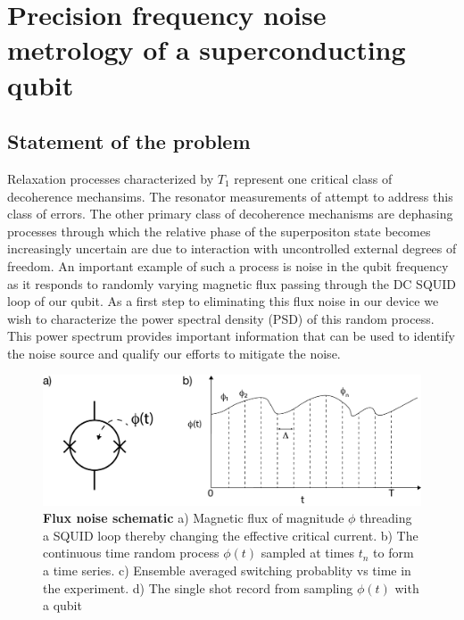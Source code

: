 \chapter{Precision frequency noise metrology of a superconducting qubit}

\section{Statement of the problem}
Relaxation processes characterized by $T_1$ represent one critical class of decoherence mechansims.
The resonator measurements of  attempt to address this class of errors.
The other primary class of decoherence mechanisms are dephasing processes through which the relative phase of the superpositon state becomes increasingly uncertain are due to interaction with uncontrolled external degrees of freedom.
An important example of such a process is noise in the qubit frequency as it responds to randomly varying magnetic flux passing through the DC SQUID loop of our qubit.
As a first step to eliminating this flux noise in our device we wish to characterize the power spectral density (PSD) of this random process.
This power spectrum provides important information that can be used to identify the noise source and qualify our efforts to mitigate the noise.
\begin{figure}[h]
    \begin{center}
        \includegraphics[width=150mm]{./PDF/flux_noise_schematic_191007_212p.pdf}
    \end{center}
    \caption{\textbf{Flux noise schematic}
    a) Magnetic flux of magnitude $\phi$ threading a SQUID loop thereby changing the effective critical current.
    b) The continuous time random process $\phi (t)$ sampled at times $t_n$ to form a time series.
    c) Ensemble averaged switching probablity vs time in the experiment.
    d) The single shot record from sampling $\phi (t)$ with a qubit}
    \label{Averaging_window_size}
\end{figure}

